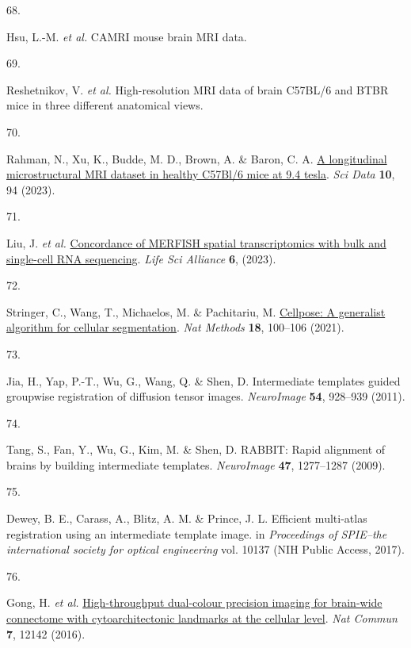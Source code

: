 \documentclass[
  12pt,
]{article}
\newlength{\cslhangindent}
\newlength{\csllabelwidth}
\newenvironment{CSLReferences}[2] %
 {\begin{list}{}{%
  \setlength{\itemindent}{0pt}
  \setlength{\leftmargin}{0pt}
  \setlength{\parsep}{0pt}
  \ifodd #1
   \setlength{\leftmargin}{\cslhangindent}
   \setlength{\itemindent}{-1\cslhangindent}
  \fi
  \setlength{\itemsep}{#2\baselineskip}}}
 {\end{list}}
\newcommand{\CSLLeftMargin}[1]{\parbox[t]{\csllabelwidth}{\strut#1\strut}}
\newcommand{\CSLRightInline}[1]{\parbox[t]{\linewidth - \csllabelwidth}{\strut#1\strut}}
\begin{document}
\begin{CSLReferences}{0}{0}
\CSLLeftMargin{68. }%
\CSLRightInline{Hsu, L.-M. \emph{et al.} CAMRI mouse brain MRI data.}

\CSLLeftMargin{69. }%
\CSLRightInline{Reshetnikov, V. \emph{et al.} High-resolution MRI data
of brain C57BL/6 and BTBR mice in three different anatomical views.}

\CSLLeftMargin{70. }%
\CSLRightInline{Rahman, N., Xu, K., Budde, M. D., Brown, A. \& Baron, C.
A. \href{https://doi.org/10.1038/s41597-023-01942-5}{A longitudinal
microstructural MRI dataset in healthy C57Bl/6 mice at 9.4 tesla}.
\emph{Sci Data} \textbf{10}, 94 (2023).}

\CSLLeftMargin{71. }%
\CSLRightInline{Liu, J. \emph{et al.}
\href{https://doi.org/10.26508/lsa.202201701}{Concordance of MERFISH
spatial transcriptomics with bulk and single-cell RNA sequencing}.
\emph{Life Sci Alliance} \textbf{6}, (2023).}

\CSLLeftMargin{72. }%
\CSLRightInline{Stringer, C., Wang, T., Michaelos, M. \& Pachitariu, M.
\href{https://doi.org/10.1038/s41592-020-01018-x}{Cellpose: A generalist
algorithm for cellular segmentation}. \emph{Nat Methods} \textbf{18},
100--106 (2021).}

\CSLLeftMargin{73. }%
\CSLRightInline{Jia, H., Yap, P.-T., Wu, G., Wang, Q. \& Shen, D.
Intermediate templates guided groupwise registration of diffusion tensor
images. \emph{NeuroImage} \textbf{54}, 928--939 (2011).}

\CSLLeftMargin{74. }%
\CSLRightInline{Tang, S., Fan, Y., Wu, G., Kim, M. \& Shen, D. RABBIT:
Rapid alignment of brains by building intermediate templates.
\emph{NeuroImage} \textbf{47}, 1277--1287 (2009).}

\CSLLeftMargin{75. }%
\CSLRightInline{Dewey, B. E., Carass, A., Blitz, A. M. \& Prince, J. L.
Efficient multi-atlas registration using an intermediate template image.
in \emph{Proceedings of SPIE--the international society for optical
engineering} vol. 10137 (NIH Public Access, 2017).}

\CSLLeftMargin{76. }%
\CSLRightInline{Gong, H. \emph{et al.}
\href{https://doi.org/10.1038/ncomms12142}{High-throughput dual-colour
precision imaging for brain-wide connectome with cytoarchitectonic
landmarks at the cellular level}. \emph{Nat Commun} \textbf{7}, 12142
(2016).}


\end{CSLReferences}
\end{document}
